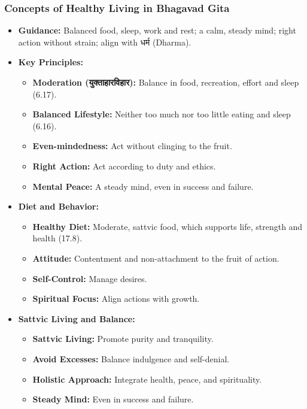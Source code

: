 \begin{frame}[fragile]\frametitle{Concepts of Healthy Living in Bhagavad Gita}

    \begin{itemize}
        \item \textbf{Guidance:} Balanced food, sleep, work and rest; a calm, steady mind; right action without strain; align with धर्म (Dharma).
        \item \textbf{Key Principles:}
          \begin{itemize}
              \item \textbf{Moderation (युक्ताहारविहार):} Balance in food, recreation, effort and sleep (6.17).
              \item \textbf{Balanced Lifestyle:} Neither too much nor too little eating and sleep (6.16).
              \item \textbf{Even-mindedness:} Act without clinging to the fruit.
              \item \textbf{Right Action:} Act according to duty and ethics.
              \item \textbf{Mental Peace:} A steady mind, even in success and failure.
          \end{itemize}
        \item \textbf{Diet and Behavior:}
          \begin{itemize}
              \item \textbf{Healthy Diet:} Moderate, sattvic food, which supports life, strength and health (17.8).
              \item \textbf{Attitude:} Contentment and non-attachment to the fruit of action.
              \item \textbf{Self-Control:} Manage desires.
              \item \textbf{Spiritual Focus:} Align actions with growth.
          \end{itemize}
        \item \textbf{Sattvic Living and Balance:}
          \begin{itemize}
              \item \textbf{Sattvic Living:} Promote purity and tranquility.
              \item \textbf{Avoid Excesses:} Balance indulgence and self-denial.
              \item \textbf{Holistic Approach:} Integrate health, peace, and spirituality.
              \item \textbf{Steady Mind:} Even in success and failure.
          \end{itemize}
    \end{itemize}

\end{frame}



